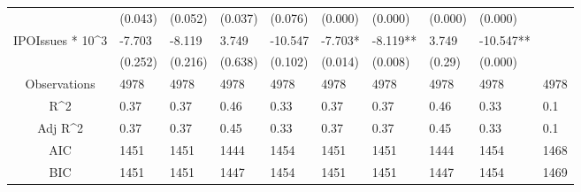 \documentclass{article}
\begin{document}
\begin{table}[H]
\begin{tabular}{|clllllllll|}
   & (0.043) & (0.052) & (0.037) & (0.076) & (0.000) & (0.000) & (0.000) & (0.000) &  \\ 
  IPOIssues * 10^3 & -7.703 & -8.119 & 3.749 & -10.547 & -7.703* & -8.119** & 3.749 & -10.547** &  \\ 
   & (0.252) & (0.216) & (0.638) & (0.102) & (0.014) & (0.008) & (0.29) & (0.000) &  \\ 
  \hline 
 Observations & 4978 & 4978 & 4978 & 4978 & 4978 & 4978 & 4978 & 4978 & 4978 \\ 
  R^2 & 0.37 & 0.37 & 0.46 & 0.33 & 0.37 & 0.37 & 0.46 & 0.33 & 0.1 \\ 
  Adj R^2 & 0.37 & 0.37 & 0.45 & 0.33 & 0.37 & 0.37 & 0.45 & 0.33 & 0.1 \\ 
  AIC & 1451 & 1451 & 1444 & 1454 & 1451 & 1451 & 1444 & 1454 & 1468 \\ 
  BIC & 1451 & 1451 & 1447 & 1454 & 1451 & 1451 & 1447 & 1454 & 1469 \\ 
   \hline
\end{tabular}
 
\end{table}
\end{document}
